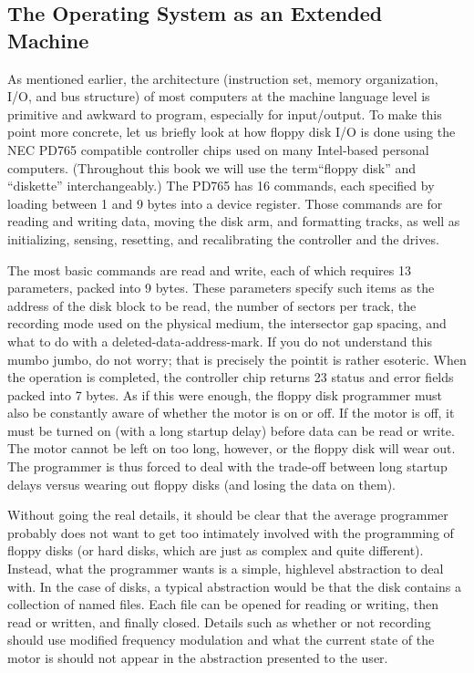 \documentclass{book}
\begin{document}
\subsection{The Operating System as an Extended Machine}
As mentioned earlier, the architecture (instruction set, memory organization, I/O, and bus structure) of most computers 
at the machine language level is primitive and awkward to program, especially for input/output.
To make this point more concrete, let us briefly look at how floppy disk I/O is done 
using the NEC PD765 compatible controller chips used on many Intel-based personal computers.
(Throughout this book we will use the term``floppy disk'' and ``diskette'' interchangeably.)
The PD765 has 16 commands, each specified by loading between 1 and 9 bytes into a device register.
Those commands are for reading and writing data, moving the disk arm, and formatting tracks, 
as well as initializing, sensing, resetting, and recalibrating the controller and the drives.

The most basic commands are read and write, each of which requires 13 parameters, packed into 9 bytes.
These parameters specify such items as the address of the disk block to be read, the number of sectors per track, 
the recording mode used on the physical medium, the intersector gap spacing, and what to do with a deleted-data-address-mark.
If you do not understand this mumbo jumbo, do not worry; that is precisely the pointit is rather esoteric.
When the operation is completed, the controller chip returns 23 status and error fields packed into 7 bytes.
As if this were enough, the floppy disk programmer must also be constantly aware of whether the motor is on or off.
If the motor is off, it must be turned on (with a long startup delay) before data can be read or write.
The motor cannot be left on too long, however, or the floppy disk will wear out.
The programmer is thus forced to deal with the trade-off between long startup delays versus wearing out floppy disks (and losing the data on them).

Without going the real details, it should be clear that the average programmer probably does not want to 
get too intimately involved with the programming of floppy disks (or hard disks, which are just as complex and quite different).
Instead, what the programmer wants is a simple, highlevel abstraction to deal with.
In the case of disks, a typical abstraction would be that the disk contains a collection of named files.
Each file can be opened for reading or writing, then read or written, and finally closed.
Details such as whether or not recording should use modified frequency modulation and 
what the current state of the motor is should not appear in the abstraction presented to the user.
\end{document}
